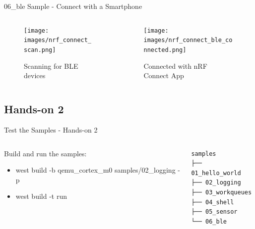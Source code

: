 \documentclass[10pt, aspectratio=169]{beamer}
\begin{document}
\begin{frame}[fragile]{06\_ble Sample - Connect with a Smartphone}
  \begin{columns}
    \begin{column}{0.5\textwidth}
      \begin{figure}
        \texttt{[image: images/nrf\_connect\_scan.png]}
        \caption*{Scanning for BLE devices}
      \end{figure}
    \end{column}
    \begin{column}{0.5\textwidth}
      \begin{figure}
        \texttt{[image: images/nrf\_connect\_ble\_connected.png]}
        \caption*{Connected with nRF Connect App}
      \end{figure}
    \end{column}
  \end{columns}
\end{frame}
\subsection{Hands-on 2}
\begin{frame}[fragile]{Test the Samples - Hands-on 2}
  \begin{columns}
    \begin{column}{0.6\textwidth}
      Build and run the samples\footnotemark[1]:
      \begin{itemize}
        \item \scriptsize west build -b qemu\_cortex\_m0 samples/02\_logging -p
        \item \scriptsize west build -t run
      \end{itemize}
    \end{column}
    \begin{column}{0.4\textwidth}
        {\fontsize{7}{7}\selectfont
          \begin{verbatim}
samples
├── 01_hello_world
├── 02_logging
├── 03_workqueues
├── 04_shell
├── 05_sensor
└── 06_ble
        \end{verbatim}
      }
    \end{column}
  \end{columns}
\end{frame}
\end{document}
